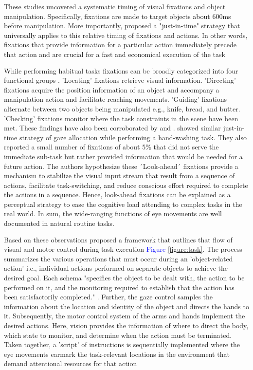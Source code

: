 These studies uncovered a systematic timing of visual fixations and object manipulation. Specifically, fixations are made to target objects about 600ms before manipulation. More importantly, \citet{Ballard1995-ji} proposed a "just-in-time" strategy that universally applies to this relative timing of fixations and actions. In other words, fixations that provide information for a particular action immediately precede that action and are crucial for a fast and economical execution of the task

While performing habitual tasks fixations can be broadly categorized into four functional groups \citep{Land2001-do}. ’Locating’ fixations retrieve visual information. ’Directing’ fixations acquire the position information of an object and accompany a manipulation action and facilitate reaching movements. ’Guiding’ fixations alternate between two objects being manipulated e.g., knife, bread, and butter. ’Checking’ fixations monitor where the task constraints in the scene have been met. These findings have also been corroborated by \citet{Pelz2001-cn} and \citet{Mennie2007-my}. \citet{Pelz2001-cn} showed similar just-in-time strategy of gaze allocation while performing a hand-washing task. They also reported a small number of fixations of about 5\% that did not serve the immediate sub-task but rather provided information that would be needed for a future action. The authors hypothesize these ´Look-ahead´ fixations provide a mechanism to stabilize the visual input stream that result from a sequence of actions, facilitate task-switching, and reduce conscious effort required to complete the actions in a sequence. Hence, look-ahead fixations can be explained as a perceptual strategy to ease the cognitive load attending to complex tasks in the real world. In sum, the wide-ranging functions of eye movements are well documented in natural routine tasks.

Based on these observations \citet{Land2001-do} proposed a framework that outlines that flow of visual and motor control during task execution \textcolor{Blue}{Figure \ref{figure:task}}. The process summarizes the various operations that must occur during an ’object-related action’ i.e., individual actions performed on separate objects to achieve the desired goal. Each schema "specifies the object to be dealt with, the action to be performed on it, and the monitoring required to establish that the action has been satisfactorily completed." \citep{Land2006-da}. Further, the gaze control samples the information about the location and identity of the object and directs the hands to it. Subsequently, the motor control system of the arms and hands implement the desired actions. Here, vision provides the information of where to direct the body, which state to monitor, and determine when the action must be terminated. Taken together, a ’script’ of instructions is sequentially implemented where the eye movements earmark the task-relevant locations in the environment that demand attentional resources for that action

